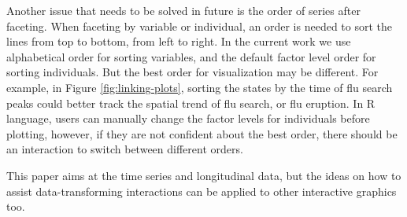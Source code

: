 \documentclass[12pt]{article}
\begin{document}
Another issue that needs to be solved in future is the order of
series after faceting. When faceting by variable or individual,
an order is needed to sort the lines from top to bottom, from
left to right. In the current work we use alphabetical order for
sorting variables, and the default factor level order for sorting
individuals. But the best order for visualization may be different.
For example, in Figure \ref{fig:linking-plots}, sorting the states
by the time of flu search peaks could better track the spatial
trend of flu search, or flu eruption. In R language, users can
manually change the factor levels for individuals before plotting,
however, if they are not confident about the best order, there
should be an interaction to switch between different orders.

This paper aims at the time series and longitudinal data, but the
ideas on how to assist data-transforming interactions can be applied
to other interactive graphics too.



\end{document}
